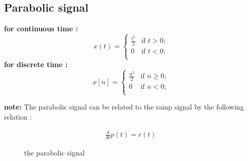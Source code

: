 \documentclass[a4paper,12pt]{book}
\begin{document}
\subsection*{ Parabolic signal}
{\bf for continuous time :}\\
	\[ x(t) = \left\{ \begin{array}{ll}

	\frac{t^2 }{2} & \mbox{if $t > 0$;} \\

	0 & \mbox{if $t < 0$;} \\

	\end{array}
	\right. \]
\bigskip
{\bf for discrete time :}\\
	\[ x[n] = \left\{ \begin{array}{ll}

	\frac{n^2 }{2} & \mbox{if $n \geq 0$;} \\

	0 & \mbox{if $n < 0$;} \\

	\end{array}
	\right. \]

{\bf note:} The parabolic signal can be related to the ramp signal by the following relation :

\begin{align*}
\frac{d }{dt}p(t) = r(t)
\end{align*}

\begin{figure}[h]  
\centering 
{}\hspace{6mm}
\caption{the parabolic signal} \label{fig:M}  
\end{figure}
\end{document}
